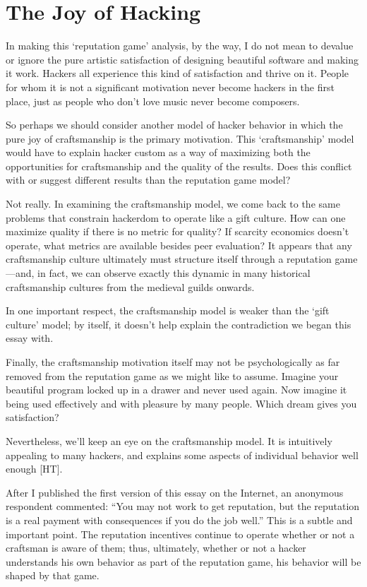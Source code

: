 \section{The Joy of Hacking}


In making this `reputation game' analysis, by the way, I do not mean to devalue
or ignore the pure artistic satisfaction of designing beautiful software and
making it work.  Hackers all experience this kind of satisfaction and thrive on
it.  People for whom it is not a significant motivation never become hackers in
the first place, just as people who don't love music never become composers.

So perhaps we should consider another model of hacker behavior in which the pure
joy of craftsmanship is the primary motivation.  This `craftsmanship' model
would have to explain hacker custom as a way of maximizing both the
opportunities for craftsmanship and the quality of the results.  Does this
conflict with or suggest different results than the reputation game model?

Not really.  In examining the craftsmanship model, we come back to the same
problems that constrain hackerdom to operate like a gift culture.  How can one
maximize quality if there is no metric for quality? If scarcity economics
doesn't operate, what metrics are available besides peer evaluation? It appears
that any craftsmanship culture ultimately must structure itself through a
reputation game—and, in fact, we can observe exactly this dynamic in many
historical craftsmanship cultures from the medieval guilds onwards.

In one important respect, the craftsmanship model is weaker than the `gift
culture' model; by itself, it doesn't help explain the contradiction we began
this essay with.

Finally, the craftsmanship motivation itself may not be psychologically as far
removed from the reputation game as we might like to assume.  Imagine your
beautiful program locked up in a drawer and never used again.  Now imagine it
being used effectively and with pleasure by many people.  Which dream gives you
satisfaction?

Nevertheless, we'll keep an eye on the craftsmanship model.  It is intuitively
appealing to many hackers, and explains some aspects of individual behavior well
enough [HT].

After I published the first version of this essay on the Internet, an anonymous
respondent commented: ``You may not work to get reputation, but the reputation
is a real payment with consequences if you do the job well.'' This is a subtle
and important point.  The reputation incentives continue to operate whether or
not a craftsman is aware of them; thus, ultimately, whether or not a hacker
understands his own behavior as part of the reputation game, his behavior will
be shaped by that game.

